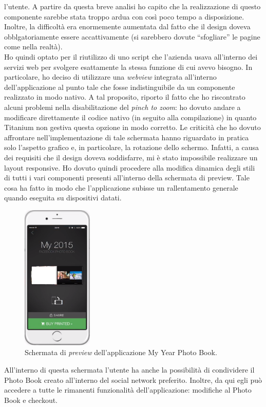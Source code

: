 				l'utente. A partire da questa breve analisi ho capito che la realizzazione di questo componente sarebbe stata
				troppo ardua con così poco tempo a disposizione. Inoltre, la difficoltà era enormemente aumentata dal fatto che il
				design doveva obblgatoriamente essere accattivamente (si sarebbero dovute “sfogliare” le pagine come nella realtà).\\
				Ho quindi optato per il riutilizzo di uno script che l'azienda usava all'interno dei servizi web per svolgere
				esattamente la stessa funzione di cui avevo bisogno. In particolare, ho deciso di utilizzare una \emph{webview}
				integrata all'interno dell'applicazione al punto tale che fosse indistinguibile da un componente realizzato in modo
				nativo. A tal proposito, riporto il fatto che ho riscontrato alcuni problemi nella disabilitazione del
				\emph{pinch to zoom}: ho dovuto andare a modificare direttamente il codice nativo (in seguito alla compilazione)
				in quanto Titanium non gestiva questa opzione in modo corretto.
				Le criticità che ho dovuto affrontare nell'implementazione di tale schermata hanno riguardato in pratica solo
				l'aspetto grafico e, in particolare, la rotazione dello schermo. Infatti, a causa dei requisiti che il design doveva
				soddisfarre, mi è stato impossibile realizzare un layout responsive. Ho dovuto quindi procedere alla modifica
				dinamica degli stili di tutti i vari componenti presenti all'interno della schermata di preview. Tale cosa ha fatto
				in modo che l'applicazione subisse un rallentamento generale quando eseguita su dispositivi datati.
				\begin{figure}[H]
					\centering
					\includegraphics[width=0.3\textwidth]{capitolo_3/immagini/schermata_di_visualizzazione.png}
					\caption{Schermata di \emph{preview} dell'applicazione My Year Photo Book.}
				\end{figure}
				\noindent All'interno di questa schermata l'utente ha anche la possibilità di condividere il Photo Book creato
				all'interno del social network preferito. Inoltre, da qui egli può accedere a tutte le rimanenti funzionalità
				dell'applicazione: modifiche al Photo Book e checkout.
